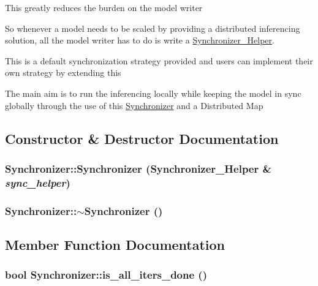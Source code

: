 This greatly reduces the burden on the model writer

So whenever a model needs to be scaled by providing a distributed inferencing solution, all the model writer has to do is write a \hyperlink{class_synchronizer___helper}{Synchronizer\_\-Helper}.

This is a default synchronization strategy provided and users can implement their own strategy by extending this

The main aim is to run the inferencing locally while keeping the model in sync globally through the use of this \hyperlink{class_synchronizer}{Synchronizer} and a Distributed Map 

\subsection{Constructor \& Destructor Documentation}
\hypertarget{class_synchronizer_a7b0b39f6e15645271bf1afa043027ceb}{
\subsubsection[{Synchronizer}]{\setlength{\rightskip}{0pt plus 5cm}Synchronizer::Synchronizer ({\bf Synchronizer\_\-Helper} \& {\em sync\_\-helper})}}
\label{class_synchronizer_a7b0b39f6e15645271bf1afa043027ceb}
\hypertarget{class_synchronizer_a3fb971c6c9cdb4ab5cddb3e2d3b6ac6f}{
\subsubsection[{$\sim$Synchronizer}]{\setlength{\rightskip}{0pt plus 5cm}Synchronizer::$\sim$Synchronizer ()}}
\label{class_synchronizer_a3fb971c6c9cdb4ab5cddb3e2d3b6ac6f}


\subsection{Member Function Documentation}
\hypertarget{class_synchronizer_a204d452071fdb6db0247fa2ec1194511}{
\subsubsection[{is\_\-all\_\-iters\_\-done}]{\setlength{\rightskip}{0pt plus 5cm}bool Synchronizer::is\_\-all\_\-iters\_\-done ()}}
\label{class_synchronizer_a204d452071fdb6db0247fa2ec1194511}


